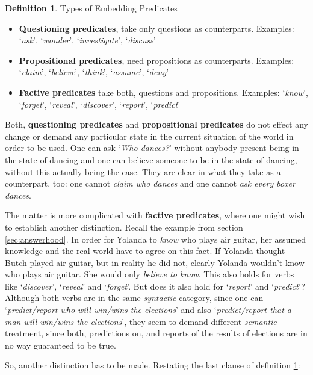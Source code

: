 \documentclass[notitlepage,twoside,a4paper]{scrreprt}
\newcommand{\term}[1]{\textsf{\textbf{#1}}} %
\newcommand{\example}[1]{`\textit{#1}'} %
\theoremstyle{remark}
\theoremstyle{remark}
\theoremstyle{definition}
\newtheorem{definition}[thm]{Definition}
\theoremstyle{definition}
\begin{document}
\begin{definition}\label{def:embed1}
  Types of Embedding Predicates
\begin{itemize}
  \item \term{Questioning predicates}, take only questions as counterparts.
  Examples: \example{ask}, \example{wonder}, \example{investigate},
  \example{discuss}
  \item \term{Propositional predicates}, need propositions as counterparts.
  Examples: \example{claim}, \example{believe}, \example{think},
  \example{assume}, \example{deny}
  \item \term{Factive predicates} take both, questions and propositions.
  Examples:
  \example{know}, \example{forget}, \example{reveal}, \example{discover},
  \example{report}, \example{predict}
\end{itemize}
\end{definition}

Both, \term{questioning predicates} and \term{propositional predicates} do not
effect any change or demand any particular state in the current situation of the
world in order to be used. One can ask \example{Who dances?} without anybody
present being in the state of dancing and one can believe someone to be in the
state of dancing, without this actually being the case. They are clear in what
they take as a counterpart, too: one cannot \emph{claim who dances} and one
cannot \emph{ask every boxer dances}.

The matter is more complicated with \term{factive predicates}, where
one might wish to establish another distinction. Recall the example from section
\ref{sec:answerhood}. In order for Yolanda to \emph{know} who plays air guitar,
her assumed knowledge and the real world have to agree on this fact. If Yolanda
thought Butch played air guitar, but in reality he did not, clearly Yolanda
wouldn't know who plays air guitar. She would only \emph{believe to know}.
This also holds for
verbs like \example{discover}, \example{reveal} and \example{forget}. But does
it also hold for \example{report} and \example{predict}? Although both verbs are
in the same \emph{syntactic} category, since one can \example{predict/report who will
win/wins the elections} and also \example{predict/report that a man will
win/wins the elections}, they seem to demand different \emph{semantic}
treatment, since both, predictions on, and reports of the results of elections are
in no way guaranteed to be true.

So, another distinction has to be made. Restating the last clause of definition
\ref{def:embed1}:
\end{document}
